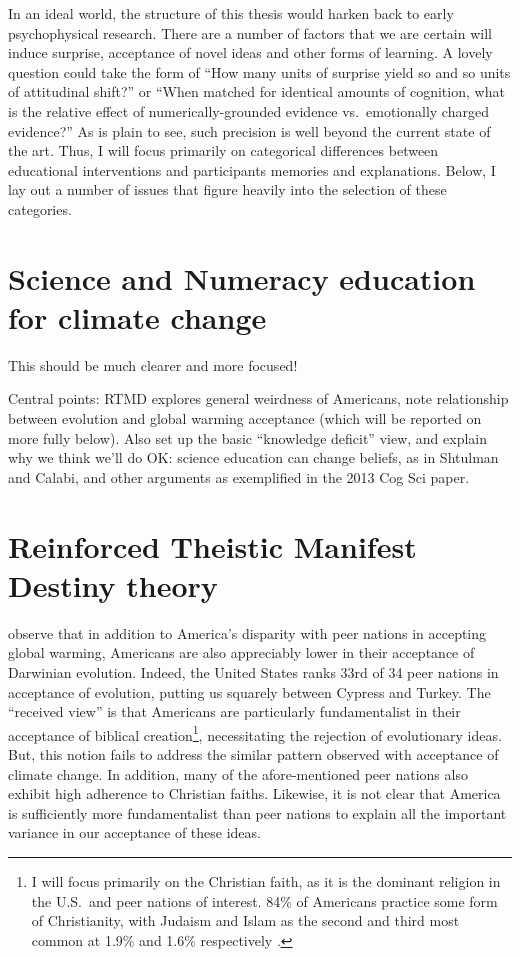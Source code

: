 In an ideal world, the structure of this thesis would harken back to early
psychophysical research. There are a number of factors that we are certain will
induce surprise, acceptance of novel ideas and other forms of learning. A
lovely question could take the form of ``How many units of surprise yield so and
so units of attitudinal shift?'' or ``When matched for identical amounts of
cognition, what is the relative effect of numerically-grounded evidence vs.\
emotionally charged evidence?'' As is plain to see, such precision is well
beyond the current state of the art. Thus, I will focus primarily on categorical
differences between educational interventions and participants memories and
explanations. Below, I lay out a number of issues that figure heavily into the
selection of these categories.

\section{Science and Numeracy education for climate change}

This should be much clearer and more focused! 

Central points: RTMD explores general weirdness of Americans, note relationship
between evolution and global warming acceptance (which will be reported on more
fully below). Also set up the basic “knowledge deficit” view, and explain why we
think we'll do OK: science education can change beliefs, as in Shtulman and
Calabi, and other arguments as exemplified in the 2013 Cog Sci paper.

\section{Reinforced Theistic Manifest Destiny theory}


\citeauthor{ranney_why_2012} observe that in addition to America's disparity
with peer nations in accepting global warming, Americans are also appreciably
lower in their acceptance of Darwinian evolution. Indeed, the United States
ranks 33rd of 34 peer nations in acceptance of evolution, putting us
squarely between Cypress and Turkey. The ``received view'' is that Americans are
particularly fundamentalist in their acceptance of biblical creation\footnote{I
will focus primarily on the Christian faith, as it is the dominant religion in
the U.S.\ and peer nations of interest. 84\% of Americans practice some form of
Christianity, with Judaism and Islam as the second and third most common at
1.9\% and 1.6\% respectively \cite{wolfram_alpha_faith}.}, 
necessitating the rejection of evolutionary ideas. But, this notion fails to
address the similar pattern observed with acceptance of climate change. In
addition, many of the afore-mentioned peer nations also exhibit high adherence
to Christian faiths.  Likewise, it is not clear that America is sufficiently
more fundamentalist than peer nations to explain all the important variance in
our acceptance of these ideas. 

